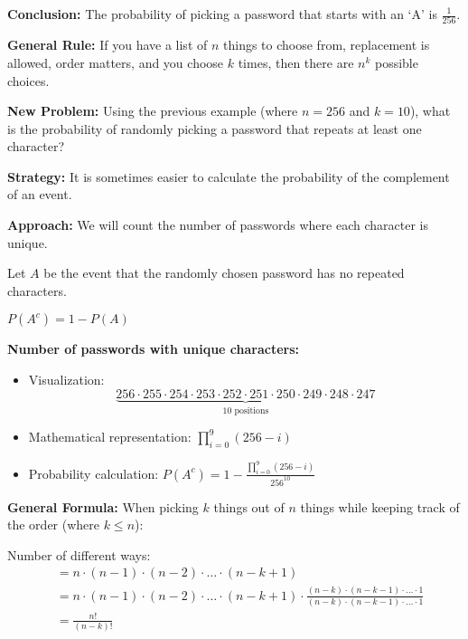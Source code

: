\documentclass{article}
\begin{document}
\textbf{Conclusion:} The probability of picking a password that starts with an `A' is $\frac{1}{256}$.

\noindent
\textbf{General Rule:} If you have a list of $n$ things to choose from, replacement is allowed, order matters, and you choose $k$ times, then there are $n^k$ possible choices.

\vspace{0.5cm}

\noindent
\textbf{New Problem:} Using the previous example (where $n = 256$ and $k = 10$), what is the probability of randomly picking a password that repeats at least one character?

\vspace{0.3cm}

\noindent
\textbf{Strategy:} It is sometimes easier to calculate the probability of the complement of an event.

\vspace{0.3cm}

\noindent
\textbf{Approach:} We will count the number of passwords where each character is unique.

\vspace{0.3cm}

\noindent
Let $A$ be the event that the randomly chosen password has no repeated characters.

$P(A^c) = 1 - P(A)$


\textbf{Number of passwords with unique characters:}
\begin{itemize}
    \item Visualization:
        \[\underbrace{256 \cdot 255 \cdot 254 \cdot 253 \cdot 252 \cdot 251 \cdot 250 \cdot 249 \cdot 248 \cdot 247}_{10\text{ positions}}\]
    \item Mathematical representation: $\prod_{i=0}^{9} (256 - i)$
    \item Probability calculation: $P(A^c) = 1 - \frac{\prod_{i=0}^{9} (256 - i)}{256^{10}}$
\end{itemize}

\vspace{0.5cm}

\pagebreak
\noindent
\textbf{General Formula:} When picking $k$ things out of $n$ things while keeping track of the order (where $k \leq n$):

\vspace{0.3cm}

\noindent
Number of different ways:
\begin{align*}
    &= n \cdot (n-1) \cdot (n-2) \cdot \ldots \cdot (n-k+1) \\
    &= n \cdot (n-1) \cdot (n-2) \cdot \ldots \cdot (n-k+1) \cdot \frac{(n-k) \cdot (n-k-1) \cdot \ldots \cdot 1}{(n-k) \cdot (n-k-1) \cdot \ldots \cdot 1} \\
    &= \frac{n!}{(n-k)!}
\end{align*}
\end{document}
